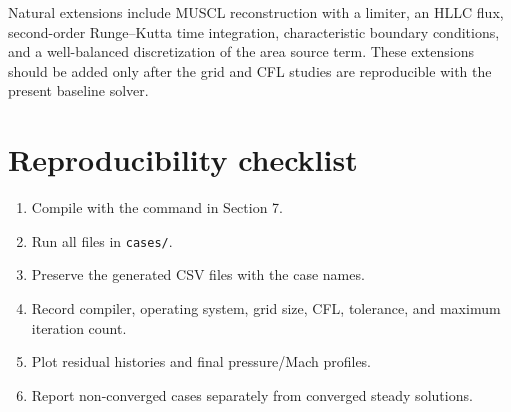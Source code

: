 \documentclass[11pt,a4paper]{article}
\begin{document}
Natural extensions include MUSCL reconstruction with a limiter, an HLLC flux,
second-order Runge--Kutta time integration, characteristic boundary conditions,
and a well-balanced discretization of the area source term. These extensions
should be added only after the grid and CFL studies are reproducible with the
present baseline solver.

\section{Reproducibility checklist}
\begin{enumerate}
  \item Compile with the command in Section 7.
  \item Run all files in \texttt{cases/}.
  \item Preserve the generated CSV files with the case names.
  \item Record compiler, operating system, grid size, CFL, tolerance, and
        maximum iteration count.
  \item Plot residual histories and final pressure/Mach profiles.
  \item Report non-converged cases separately from converged steady solutions.
\end{enumerate}
\end{document}
